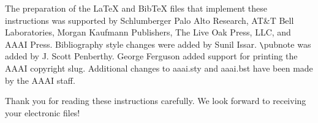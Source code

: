 \documentclass[letterpaper]{article} %
\begin{document}
The preparation of the \LaTeX{} and Bib\TeX{} files that implement these instructions was supported by Schlumberger Palo Alto Research, AT\&T Bell Laboratories, Morgan Kaufmann Publishers, The Live Oak Press, LLC, and AAAI Press. Bibliography style changes were added by Sunil Issar. \verb+\+pubnote was added by J. Scott Penberthy. George Ferguson added support for printing the AAAI copyright slug. Additional changes to aaai.sty and aaai.bst have been made by the AAAI staff.

\bigskip
\noindent Thank you for reading these instructions carefully. We look forward to receiving your electronic files!


\end{document}
